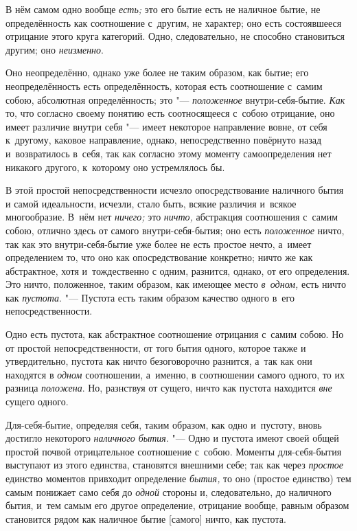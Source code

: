 
В нём самом одно вообще {\em есть;} это его бытие есть
не наличное бытие, не определённость как соотношение с~другим, не характер;
оно есть состоявшееся отрицание этого круга категорий. Одно, следовательно,
не способно становиться другим; оно {\em неизменно}.

Оно неопределённо, однако уже более не таким образом, как бытие; его
неопределённость есть определённость, которая есть соотношение с~самим
собою, абсолютная определённость; это
"--- {\em положенное} внутри-себя-бытие.
{\em Как} то, что согласно своему понятию есть
соотносящееся с~собою отрицание, оно имеет различие внутри себя "--- имеет
некоторое направление вовне, от себя к~другому, каковое направление,
однако, непосредственно повёрнуто назад и~возвратилось в~себя, так как
согласно этому моменту самоопределения нет никакого другого, к~которому оно
устремлялось бы.

В этой простой непосредственности исчезло опосредствование наличного бытия и
самой идеальности, исчезли, стало быть, всякие различия и~всякое
многообразие. В~нём нет {\em ничего;} это
{\em ничто,} абстракция соотношения с~самим собою,
отлично здесь от самого внутри-себя-бытия; оно есть
{\em положенное} ничто, так как это внутри-себя-бытие
уже более не есть простое нечто, а~имеет определением то, что оно как
опосредствование конкретно; ничто же как абстрактное, хотя и~тождественно с
одним, разнится, однако, от его определения. Это ничто, положенное, таким
образом, как имеющее место {\em в~одном,} есть ничто
как {\em пустота}. "--- Пустота есть таким образом
качество одного в~его непосредственности.


Одно есть пустота, как абстрактное соотношение отрицания с~самим собою. Но
от простой непосредственности, от того бытия одного, которое также и
утвердительно, пустота как ничто безоговорочно разнится, а~так как они
находятся в {\em одном} соотношении, а~именно, в
соотношении самого одного, то их разница
{\em положена}. Но, разнствуя от сущего, ничто как
пустота находится {\em вне} сущего одного.

Для-себя-бытие, определяя себя, таким образом, как одно и~пустоту, вновь
достигло некоторого {\em наличного бытия}. "--- Одно и
пустота имеют своей общей простой почвой отрицательное соотношение с~собою.
Моменты для-себя-бытия выступают из этого единства, становятся внешними
себе; так как через {\em простое} единство моментов
привходит определение {\em бытия,} то оно (простое
единство) тем самым понижает само себя до {\em одной}
стороны и, следовательно, до наличного бытия, и~тем самым его другое
определение, отрицание вообще, равным образом становится рядом как наличное
бытие [самого] ничто, как пустота.

